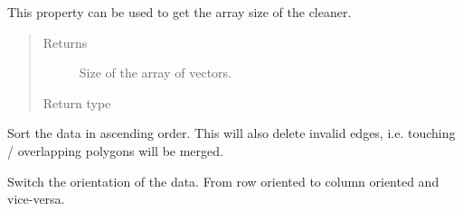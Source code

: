 \documentclass[a4paper,10pt,english]{sphinxmanual}
\begin{document}
\begin{fulllineitems}
\begin{fulllineitems}
\begin{quote}
\begin{description}
\end{description}\end{quote}

\end{fulllineitems}


\begin{fulllineitems}
\label{\detokenize{drc/drc:kppc.drc.kppc.drc.slcleaner.PyDrcSl.s}}
This property can be used to get the array size of the cleaner.
\begin{quote}\begin{description}
\item[{Returns}] \leavevmode
Size of the array of vectors.

\item[{Return type}] \leavevmode
{}%
\begin{footnote}[11]\sphinxAtStartFootnote
{}
%
\end{footnote}

\end{description}\end{quote}

\end{fulllineitems}


\begin{fulllineitems}
\label{\detokenize{drc/drc:kppc.drc.kppc.drc.slcleaner.PyDrcSl.sort}}
Sort the data in ascending order. This will also delete invalid edges, i.e. touching / overlapping polygons will be merged.

\end{fulllineitems}


\begin{fulllineitems}
\label{\detokenize{drc/drc:kppc.drc.kppc.drc.slcleaner.PyDrcSl.switch_dimensions}}
Switch the orientation of the data. From row oriented to column oriented and vice-versa.

\end{fulllineitems}


\end{fulllineitems}
\end{document}

